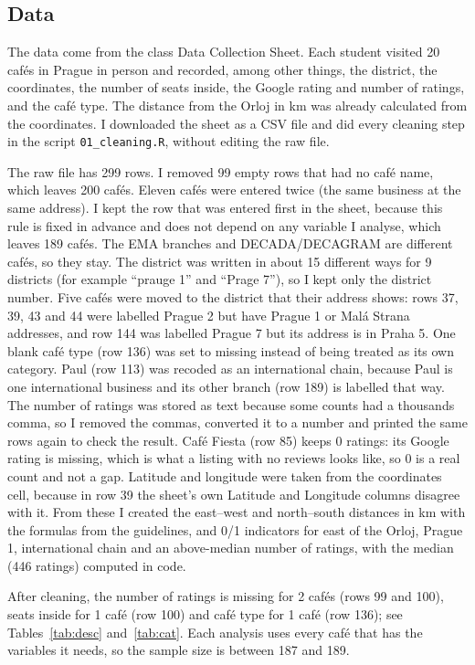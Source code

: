 \documentclass[11pt,a4paper]{article}
\begin{document}
\subsection{Data}
The data come from the class Data Collection Sheet. Each student visited 20 caf\'es in Prague in person and recorded, among other things, the district, the coordinates, the number of seats inside, the Google rating and number of ratings, and the caf\'e type. The distance from the Orloj in km was already calculated from the coordinates. I downloaded the sheet as a CSV file and did every cleaning step in the script \texttt{01\_cleaning.R}, without editing the raw file.

The raw file has 299 rows. I removed 99 empty rows that had no caf\'e name, which leaves 200 caf\'es. Eleven caf\'es were entered twice (the same business at the same address). I kept the row that was entered first in the sheet, because this rule is fixed in advance and does not depend on any variable I analyse, which leaves 189 caf\'es. The EMA branches and DECADA/DECAGRAM are different caf\'es, so they stay. The district was written in about 15 different ways for 9 districts (for example ``prauge 1'' and ``Prage 7''), so I kept only the district number. Five caf\'es were moved to the district that their address shows: rows 37, 39, 43 and 44 were labelled Prague 2 but have Prague 1 or Mal\'a Strana addresses, and row 144 was labelled Prague 7 but its address is in Praha 5. One blank caf\'e type (row 136) was set to missing instead of being treated as its own category. Paul (row 113) was recoded as an international chain, because Paul is one international business and its other branch (row 189) is labelled that way. The number of ratings was stored as text because some counts had a thousands comma, so I removed the commas, converted it to a number and printed the same rows again to check the result. Caf\'e Fiesta (row 85) keeps 0 ratings: its Google rating is missing, which is what a listing with no reviews looks like, so 0 is a real count and not a gap. Latitude and longitude were taken from the coordinates cell, because in row 39 the sheet's own Latitude and Longitude columns disagree with it. From these I created the east--west and north--south distances in km with the formulas from the guidelines, and 0/1 indicators for east of the Orloj, Prague 1, international chain and an above-median number of ratings, with the median (446 ratings) computed in code.

After cleaning, the number of ratings is missing for 2 caf\'es (rows 99 and 100), seats inside for 1 caf\'e (row 100) and caf\'e type for 1 caf\'e (row 136); see Tables~\ref{tab:desc} and~\ref{tab:cat}. Each analysis uses every caf\'e that has the variables it needs, so the sample size is between 187 and 189.
\end{document}

